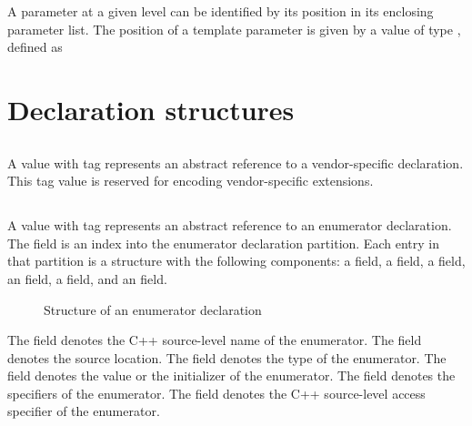 A parameter at a given level can be identified by its position in its enclosing parameter list.  The  position of a template parameter is given by a value of type , defined as 

\section{Declaration structures}
\label{sec:ifc:decl-structures}

\subsection{}
\label{sec:ifc:DeclSort:VendorExtension}
A  value with tag  represents an abstract reference to a vendor-specific declaration.
This tag value is reserved for encoding vendor-specific extensions.


\subsection{}
\label{sec:ifc:DeclSort:Enumerator}

A  value with tag  represents
an abstract reference to an enumerator declaration.
The  field is an index into the enumerator declaration partition.
Each entry in that partition is a structure with the following components:
a  field, a  field, a  field, an  field,
a  field, and an  field.
%
\begin{figure}[H]
	\centering
	\caption{Structure of an enumerator declaration}
	\label{fig:ifc-enumerator-decl-structure}
\end{figure}
%
The  field denotes the C++ source-level name of the enumerator.
The  field denotes the source location.
The  field denotes the type of the enumerator.
The  field denotes the value or the initializer of the enumerator.
The  field denotes the specifiers of the enumerator.
The  field denotes the C++ source-level access specifier of the enumerator.

